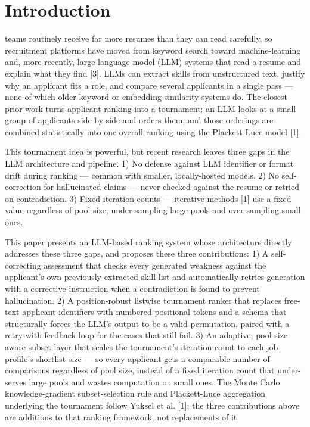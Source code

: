 \documentclass[journal]{IEEEtran}
\begin{document}
\IEEEpeerreviewmaketitle

\section{Introduction}
 teams routinely receive far more resumes than they can read carefully, so recruitment platforms have moved from keyword search toward machine-learning and, more recently, large-language-model (LLM) systems that read a resume and explain what they find [3]. LLMs can extract skills from unstructured text, justify why an applicant fits a role, and compare several applicants in a single pass --- none of which older keyword or embedding-similarity systems do. The closest prior work turns applicant ranking into a tournament: an LLM looks at a small group of applicants side by side and orders them, and those orderings are combined statistically into one overall ranking using the Plackett-Luce model [1].

This tournament idea is powerful, but recent research leaves three gaps in the LLM architecture and pipeline. 1) No defense against LLM identifier or format drift during ranking --- common with smaller, locally-hosted models. 2) No self-correction for hallucinated claims --- never checked against the resume or retried on contradiction. 3) Fixed iteration counts --- iterative methods [1] use a fixed value regardless of pool size, under-sampling large pools and over-sampling small ones.

This paper presents an LLM-based ranking system whose architecture directly addresses these three gaps, and proposes these three contributions: 1) A self-correcting assessment that checks every generated weakness against the applicant's own previously-extracted skill list and automatically retries generation with a corrective instruction when a contradiction is found to prevent hallucination. 2) A position-robust listwise tournament ranker that replaces free-text applicant identifiers with numbered positional tokens and a schema that structurally forces the LLM's output to be a valid permutation, paired with a retry-with-feedback loop for the cases that still fail. 3) An adaptive, pool-size-aware subset layer that scales the tournament's iteration count to each job profile's shortlist size --- so every applicant gets a comparable number of comparisons regardless of pool size, instead of a fixed iteration count that under-serves large pools and wastes computation on small ones. The Monte Carlo knowledge-gradient subset-selection rule and Plackett-Luce aggregation underlying the tournament follow Yuksel et al. [1]; the three contributions above are additions to that ranking framework, not replacements of it.
\end{document}
